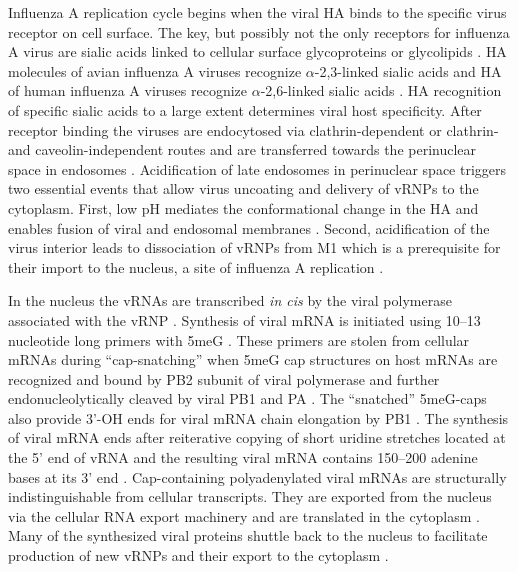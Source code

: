 	Influenza A replication cycle begins when the viral \gls{HA} binds to the specific virus receptor on cell surface. The key, but possibly not the only receptors for influenza A virus are sialic acids linked to cellular surface glycoproteins or glycolipids \parencite{Skehel2000, Stray2000, Martin1998}. \gls{HA} molecules of avian influenza A viruses recognize $\alpha$-2,3-linked sialic acids and \gls{HA} of human influenza A viruses recognize $\alpha$-2,6-linked sialic acids \parencite{Connor1994, VanRiel2010}. \gls{HA} recognition of specific sialic acids to a large extent determines viral host specificity. After receptor binding the viruses are endocytosed via clathrin-dependent or clathrin- and caveolin-independent routes and are transferred towards the perinuclear space in endosomes \parencite{Dourmashkin1974, Matlin1981, Sieczkarski2002, Lakadamyali2003}. Acidification of late endosomes in perinuclear space triggers two essential events that allow virus uncoating and delivery of \gls{vRNP}s to the cytoplasm. First, low pH mediates the conformational change in the \gls{HA} and enables fusion of viral and endosomal membranes \parencite{Carr1993}. Second, acidification of the virus interior leads to dissociation of \glspl{vRNP} from \gls{M1} which is a prerequisite for their import to the nucleus, a site of influenza A replication \parencite{Bui1996, Stauffer2014}. 
	
	In the nucleus the \glspl{vRNA} are transcribed \textit{in cis} by the viral polymerase associated with the \gls{vRNP} \parencite{Moeller2012}. Synthesis of viral mRNA is initiated using 10--13 nucleotide long primers with \gls{5meG} \parencite{Beaton1981, Plotch1981a}. These primers are stolen from cellular mRNAs during ``cap-snatching'' when \gls{5meG} cap structures on host mRNAs are recognized and bound by \gls{PB2} subunit of viral polymerase \parencite{Guilligay2008} and further endonucleolytically cleaved by viral \gls{PB1} and \gls{PA} \parencite{Li2001, Dias2009, Yuan2009}. The ``snatched'' \gls{5meG}-caps also provide 3'-OH ends for viral mRNA chain elongation by \gls{PB1} \parencite{Poch1989}. The synthesis of viral mRNA ends after reiterative copying of short uridine stretches located at the 5' end of vRNA and the resulting viral mRNA contains 150--200 adenine bases at its 3' end \parencite{Plotch1977, Robertson1981d, Poon1999}. Cap-containing polyadenylated viral mRNAs are structurally indistinguishable from cellular transcripts. They are exported from the nucleus via the cellular RNA export machinery and are translated in the cytoplasm \parencite{Chen2000}. Many of the synthesized viral proteins  shuttle back to the nucleus to facilitate production of new \gls{vRNP}s and their export to the cytoplasm \parencite{Greenspan1988, Neumann1997, Huet2010, Wang2013}. 
	
